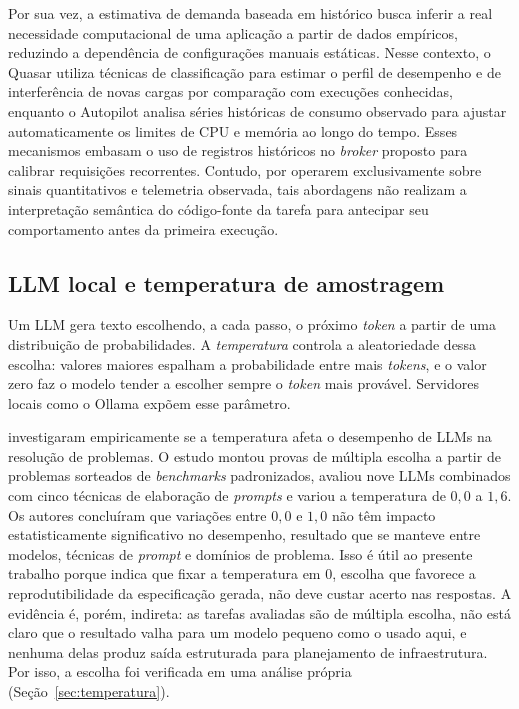\documentclass[11pt,a4paper]{article}
\begin{document}
Por sua vez, a estimativa de demanda baseada em histórico busca inferir a
real necessidade computacional de uma aplicação a partir de dados empíricos,
reduzindo a dependência de configurações manuais estáticas. Nesse contexto, o
Quasar \cite{delimitrou2014quasar} utiliza técnicas de classificação para
estimar o perfil de desempenho e de interferência de novas cargas por
comparação com execuções conhecidas, enquanto o Autopilot
\cite{rzadca2020autopilot} analisa séries históricas de consumo observado
para ajustar automaticamente os limites de CPU e memória ao longo do tempo.
Esses mecanismos embasam o uso de registros históricos no \textit{broker}
proposto para calibrar requisições recorrentes. Contudo, por operarem
exclusivamente sobre sinais quantitativos e telemetria observada, tais
abordagens não realizam a interpretação semântica do código-fonte da tarefa
para antecipar seu comportamento antes da primeira execução.

\subsection{LLM local e temperatura de amostragem}

Um LLM gera texto escolhendo, a cada passo, o próximo \textit{token} a partir
de uma distribuição de probabilidades. A \textit{temperatura} controla a
aleatoriedade dessa escolha: valores maiores espalham a probabilidade entre
mais \textit{tokens}, e o valor zero faz o modelo tender a escolher sempre o
\textit{token} mais provável. Servidores locais como o Ollama
\cite{ollama2026} expõem esse parâmetro.

 investigaram empiricamente se a temperatura
afeta o desempenho de LLMs na resolução de problemas. O estudo montou provas
de múltipla escolha a partir de problemas sorteados de \textit{benchmarks}
padronizados, avaliou nove LLMs combinados com cinco técnicas de elaboração de
\textit{prompts} e variou a temperatura de $0{,}0$ a $1{,}6$. Os autores
concluíram que variações entre $0{,}0$ e $1{,}0$ não têm impacto
estatisticamente significativo no desempenho, resultado que se manteve entre
modelos, técnicas de \textit{prompt} e domínios de problema. Isso é útil ao
presente trabalho porque indica que fixar a temperatura em $0$, escolha que
favorece a reprodutibilidade da especificação gerada, não deve custar acerto
nas respostas. A evidência é, porém, indireta: as tarefas avaliadas são de
múltipla escolha, não está claro que o resultado valha para um modelo pequeno
como o usado aqui, e nenhuma delas produz saída estruturada para planejamento
de infraestrutura.
Por isso, a escolha foi verificada em uma análise própria
(Seção~\ref{sec:temperatura}).
\end{document}
